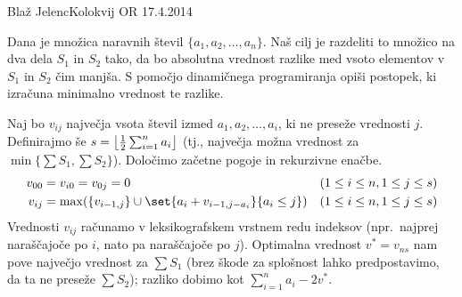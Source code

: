 \begin{naloga}{Blaž Jelenc}{Kolokvij OR 17.4.2014}
\begin{vprasanje}
Dana je množica naravnih števil $\{a_1, a_2, \dots, a_n\}$.
Naš cilj je razdeliti to množico na dva dela $S_1$ in $S_2$ tako,
da bo absolutna vrednost razlike
med vsoto elementov v $S_1$ in $S_2$ čim manjša.
S pomočjo dinamičnega programiranja opiši postopek,
ki izračuna minimalno vrednost te razlike.
\end{vprasanje}

\begin{odgovor}
Naj bo $v_{ij}$ največja vsota števil izmed $a_1, a_2, \dots, a_i$,
ki ne preseže vrednosti $j$.
Definirajmo še $s = \left\lfloor {1 \over 2} \sum_{i=1}^n a_i \right\rfloor$
(tj., največja možna vrednost za $\min\{\sum S_1, \sum S_2\}$).
Določimo začetne pogoje in rekurzivne enačbe.
\begin{align*}
v_{00} &= v_{i0} = v_{0j} = 0 && (1 \le i \le n, 1 \le j \le s) \\
v_{ij} &= \max(\{v_{i-1, j}\} \cup \set{a_i + v_{i-1, j-a_i}}{a_i \le j})
&& (1 \le i \le n, 1 \le j \le s)
\end{align*}
Vrednosti $v_{ij}$ računamo v leksikografskem vrstnem redu indeksov
(npr.~najprej naraščajoče po $i$, nato pa naraščajoče po $j$).
Optimalna vrednost $v^* = v_{ns}$ nam pove največjo vrednost za $\sum S_1$
(brez škode za splošnost lahko predpostavimo, da ta ne preseže $\sum S_2$);
razliko dobimo kot $\sum_{i=1}^n a_i - 2v^*$.
\end{odgovor}
\end{naloga}
